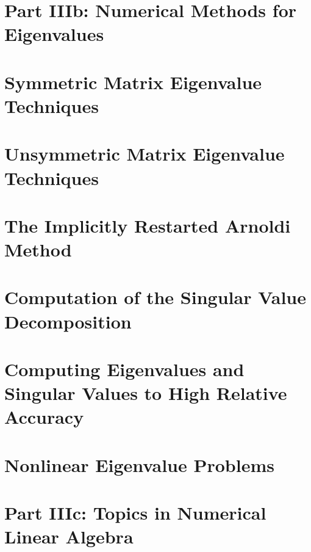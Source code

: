\documentclass[a4paper]{article}
\begin{document}
\section*{Part IIIb: Numerical Methods for Eigenvalues}

\section{Symmetric Matrix Eigenvalue Techniques}

\section{Unsymmetric Matrix Eigenvalue Techniques}

\section{The Implicitly Restarted Arnoldi Method}

\section{Computation of the Singular Value Decomposition}

\section{Computing Eigenvalues and Singular Values to High Relative Accuracy}

\section{Nonlinear Eigenvalue Problems}

\section*{Part IIIc: Topics in Numerical Linear Algebra}

\end{document}
